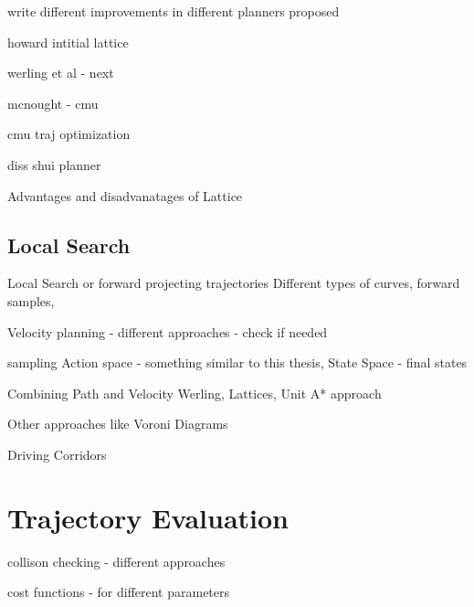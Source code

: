write different improvements in different planners proposed

howard intitial lattice 

werling et al - next

mcnought - cmu 

cmu traj optimization

diss shui planner 

Advantages and disadvanatages of Lattice 

\subsection{Local Search}
\label{rw_local_search}

Local Search or forward projecting trajectories
Different types of curves, 
forward samples, 

Velocity planning - different approaches - check if needed

sampling
Action space - something similar to this thesis, 
State Space - final states

Combining Path and Velocity Werling, Lattices, Unit A* approach







Other approaches like Voroni Diagrams

Driving Corridors 

\section{Trajectory Evaluation}
\label{traj_eval}

collison checking - different approaches 

cost functions - for different parameters


